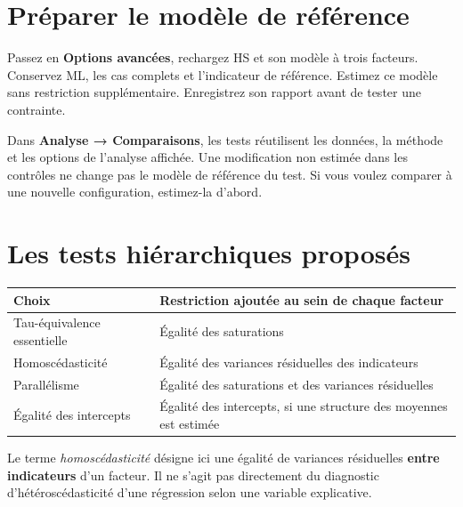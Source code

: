 \documentclass[
  french,
  11pt,
  a4paper,
  DIV=11,
  numbers=noendperiod]{scrreprt}
\newcounter{none} %
\begin{document}
\section{Préparer le modèle de
référence}\label{pruxe9parer-le-moduxe8le-de-ruxe9fuxe9rence}

Passez en \textbf{Options avancées}, rechargez HS et son modèle à trois
facteurs. Conservez ML, les cas complets et l'indicateur de référence.
Estimez ce modèle sans restriction supplémentaire. Enregistrez son
rapport avant de tester une contrainte.

Dans \textbf{Analyse → Comparaisons}, les tests réutilisent les données,
la méthode et les options de l'analyse affichée. Une modification non
estimée dans les contrôles ne change pas le modèle de référence du test.
Si vous voulez comparer à une nouvelle configuration, estimez-la
d'abord.

\section{Les tests hiérarchiques
proposés}\label{les-tests-hiuxe9rarchiques-proposuxe9s}


{\def\LTcaptype{none} %
\begin{longtable}[]{@{}
  >{\raggedright\arraybackslash}p{}
  >{\raggedright\arraybackslash}p{}@{}}
\toprule\noalign{}
\begin{minipage}[b]{\linewidth}\raggedright
Choix
\end{minipage} & \begin{minipage}[b]{\linewidth}\raggedright
Restriction ajoutée au sein de chaque facteur
\end{minipage} \\
\midrule\noalign{}
\endhead
\bottomrule\noalign{}
\endlastfoot
Tau-équivalence essentielle & Égalité des saturations \\
Homoscédasticité & Égalité des variances résiduelles des indicateurs \\
Parallélisme & Égalité des saturations et des variances résiduelles \\
Égalité des intercepts & Égalité des intercepts, si une structure des
moyennes est estimée \\
\end{longtable}
}

Le terme \emph{homoscédasticité} désigne ici une égalité de variances
résiduelles \textbf{entre indicateurs} d'un facteur. Il ne s'agit pas
directement du diagnostic d'hétéroscédasticité d'une régression selon
une variable explicative.
\end{document}
